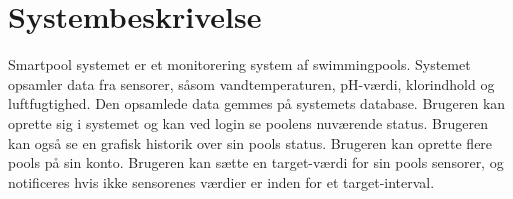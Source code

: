 \section{Systembeskrivelse}
Smartpool systemet er et monitorering system af swimmingpools. Systemet opsamler data fra sensorer, såsom vandtemperaturen, pH-værdi, klorindhold og luftfugtighed. Den opsamlede data gemmes på systemets database. Brugeren kan oprette sig i systemet og kan ved login se poolens nuværende status. Brugeren kan også se en grafisk historik over sin pools status. Brugeren kan oprette flere pools på sin konto. Brugeren kan sætte en target-værdi for sin pools sensorer, og notificeres hvis ikke sensorenes værdier er inden for et target-interval.  